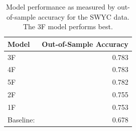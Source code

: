 \documentclass{article}
\begin{document}
\begin{table}[ht]
\centering
\caption{\label{tab:swyc}Descriptive information for the SWYC data. The SWYC contains many versions which correspond to the age of the child. Each version has exactly 10 milestones, which we mapped to Kinedu's four milestone categories. Our data contain varying numbers of children.}
\end{table}

\begin{table}[ht]
\centering
\caption{\label{tab:swycresults}Model performance as measured by out-of-sample accuracy for the SWYC data. The 3F model performs best.}
\begin{tabular}{lr}
  \hline
Model & Out-of-Sample Accuracy \\
  \hline
  3F & 0.783 \\
  4F & 0.783 \\
  5F & 0.782 \\
  2F & 0.755 \\
  1F & 0.753 \\
  Baseline: & 0.678 \\
   \hline
\end{tabular}
\end{table}
\end{document}
